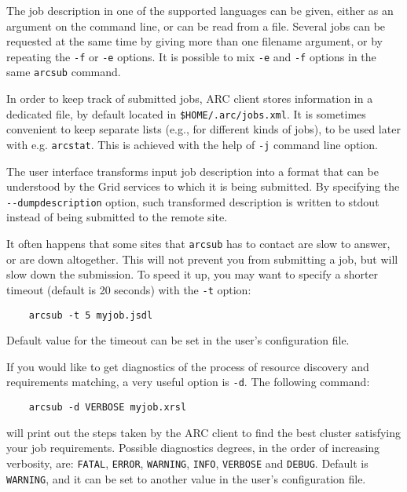 The job description in one of the supported languages can be given, either as an
argument on the command line, or can be read from a file. Several jobs can be
requested at the same time by giving more than one filename argument, or by
repeating the \verb#-f# or \verb#-e# options. It is possible to mix \verb#-e#
and \verb#-f# options in the same \texttt{arcsub} command.

In order to keep track of submitted jobs, ARC client stores information in a
dedicated file, by default located in \texttt{{\$}HOME/.arc/jobs.xml}. It is
sometimes convenient to keep separate lists (e.g., for different kinds of jobs),
to be used later with e.g. \verb#arcstat#. This is achieved with the help of
\verb#-j# command line option.

The user interface transforms input job description into a format
that can be understood by the Grid services to which it is being
submitted. By specifying the \verb#--dumpdescription# option, such transformed
description is written to stdout instead of being submitted to the remote site.




It often happens that some sites that \verb#arcsub# has to contact
are slow to answer, or are down altogether. This will not prevent
you from submitting a job, but will slow down the submission. To
speed it up, you may want to specify a shorter timeout (default is
20 seconds) with the \verb#-t# option:
\begin{verbatim}
    arcsub -t 5 myjob.jsdl
\end{verbatim}

Default value for the timeout can be set in the user's configuration file.

If you would like to get diagnostics of the process of resource
discovery and requirements matching, a very useful option is
\verb#-d#. The following command:
\begin{verbatim}
    arcsub -d VERBOSE myjob.xrsl
\end{verbatim}

will print out the steps taken by the ARC client to find the
best cluster satisfying your job requirements. Possible diagnostics degrees, in the
order of increasing verbosity, are: \texttt{FATAL}, \texttt{ERROR}, \texttt{WARNING},
\texttt{INFO}, \texttt{VERBOSE} and \texttt{DEBUG}. Default is \texttt{WARNING}, and
it can be set to another value in the user's configuration file.

